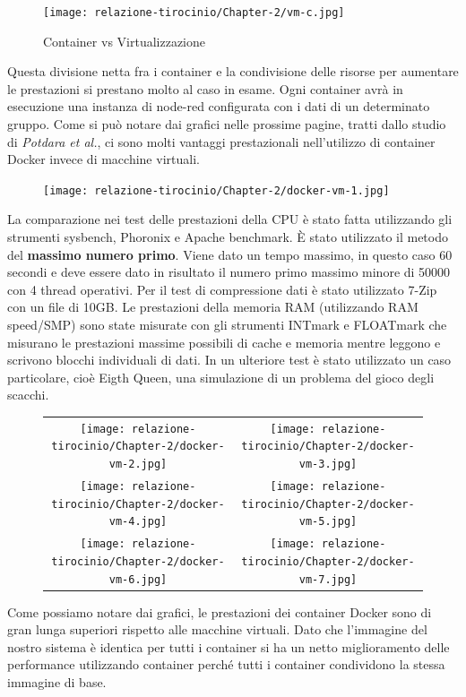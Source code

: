 \documentclass[a4paper,10pt]{memoir}
\begin{document}
\begin{figure}[ht]
\caption{Container vs Virtualizzazione}
\texttt{[image: relazione-tirocinio/Chapter-2/vm-c.jpg]}
\end{figure}
Questa divisione netta fra i container e la condivisione delle risorse per aumentare le prestazioni si prestano molto al caso in esame. Ogni container avrà in esecuzione una instanza di node-red configurata con i dati di un determinato gruppo.
Come si può notare dai grafici nelle prossime pagine, tratti dallo studio di \textit{Potdara et al.}\cite{dockervsvm}, ci sono molti vantaggi prestazionali nell'utilizzo di container Docker invece di macchine virtuali.

\begin{figure}
    \texttt{[image: relazione-tirocinio/Chapter-2/docker-vm-1.jpg]}
    \label{fig:docker-vm-1}
\end{figure}
La comparazione nei test delle prestazioni della CPU è stato fatta utilizzando gli strumenti sysbench, Phoronix e Apache benchmark. È stato utilizzato il metodo del \textbf{massimo numero primo}.
Viene dato un tempo massimo, in questo caso 60 secondi e deve essere dato in risultato il numero primo massimo minore di 50000 con 4 thread operativi.
Per il test di compressione dati è stato utilizzato 7-Zip con un file di 10GB.
Le prestazioni della memoria RAM (utilizzando RAM speed/SMP) sono state misurate con gli strumenti INTmark e FLOATmark che misurano le prestazioni massime possibili di cache e memoria mentre leggono e scrivono blocchi individuali di dati.
In un ulteriore test è stato utilizzato un caso particolare, cioè Eigth Queen, una simulazione di un problema del gioco degli scacchi.
\begin{figure}
\begin{tabular}{cc}
  \texttt{[image: relazione-tirocinio/Chapter-2/docker-vm-2.jpg]} &   \texttt{[image: relazione-tirocinio/Chapter-2/docker-vm-3.jpg]} \\
 \texttt{[image: relazione-tirocinio/Chapter-2/docker-vm-4.jpg]} &   \texttt{[image: relazione-tirocinio/Chapter-2/docker-vm-5.jpg]} \\
 \texttt{[image: relazione-tirocinio/Chapter-2/docker-vm-6.jpg]} &   \texttt{[image: relazione-tirocinio/Chapter-2/docker-vm-7.jpg]} \\
\end{tabular}
\end{figure}
Come possiamo notare dai grafici, le prestazioni dei container Docker sono di gran lunga superiori rispetto alle macchine virtuali. Dato che l'immagine del nostro sistema è identica per tutti i container si ha un netto miglioramento delle performance utilizzando container perché tutti i container condividono la stessa immagine di base.
\end{document}
